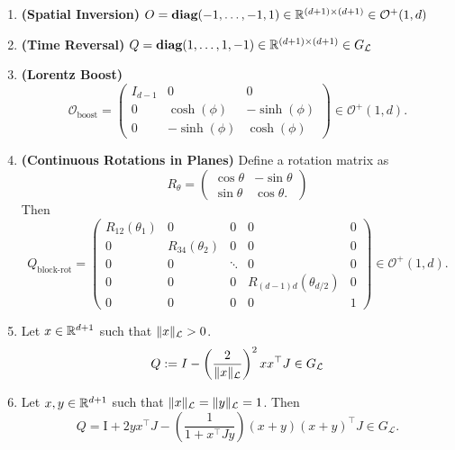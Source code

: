 \documentclass[twoside,11pt]{article}
\begin{document}
\begin{definition}
\begin{example}
\begin{enumerate}
    \item \textbf{(Spatial Inversion)}  $O = \textbf{diag}(-1,\ldots, -1, 1) \in \mathbb{R}^{(d+1)\times(d+1)} \in \mathcal{O}^+(1,d)$
    \item \textbf{(Time Reversal)} $Q = \textbf{diag}(1, \ldots, 1, -1) \in \mathbb{R}^{(d+1)\times(d+1)} \in G_{\mathcal{L}}$
    \item \textbf{(Lorentz Boost)} 
    \[
\mathcal{O}_{\text{boost}} =
\begin{pmatrix}
I_{d-1} & 0 & 0 \\
0 & \cosh(\phi) & -\sinh(\phi) \\
0 & -\sinh(\phi) & \cosh(\phi)
\end{pmatrix} \in \mathcal{O}^+(1,d).
\]
    
    \item \textbf{(Continuous Rotations in Planes)} Define a rotation matrix as 
    \[
    R_\theta = \begin{pmatrix}
        \cos \theta & - \sin \theta
        \\ \sin \theta & \cos \theta.
    \end{pmatrix}
    \]
    Then 
\[
Q_{\text{block-rot}} =
\begin{pmatrix}
R_{12}(\theta_1) & 0 & 0 & 0 & 0 \\
0 & R_{34}(\theta_2) & 0 & 0 & 0\\
0 & 0 & \ddots & 0 & 0 \\
0 & 0 & 0 & R_{(d-1)d}{(\theta_{d/2})} & 0 \\
0 & 0 & 0 & 0 & 1
\end{pmatrix} \in \mathcal{O}^{+}(1,d).
\]







     \item Let $x \in \mathbb{R}^{d+1}$ such that $\|x\|_{\mathcal{L}} > 0$. 
    \[
    Q := I - \left(\frac{2}{\|x\|_{\mathcal{L}}} \right)^2 x x^\top J \in G_{\mathcal{L}}
    \]
    \item Let $x,y \in \mathbb{R}^{d+1}$ such that $\|x\|_{\mathcal{L}} = \|y\|_{\mathcal{L}} = 1$. Then 
    \[
    Q=\mathrm{I}+2 y x^{\top} J-\left( \frac{1} {1+x^{\top} J y}\right)(x+y)(x+y)^{\top} J \in G_{\mathcal{L}} .
    \]
\end{enumerate}
    
\end{example}



\end{definition}
\end{document}
